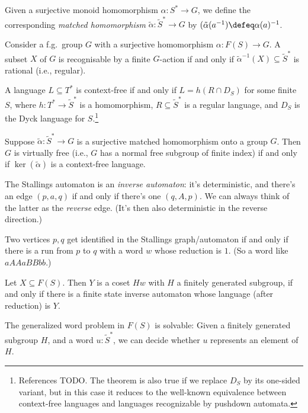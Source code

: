 Given a surjective monoid homomorphism $\alpha : S^* \to G$,
we define the corresponding \emph{matched homomorphism} $\tilde\alpha : \tilde S^* \to G$ by $(\tilde\alpha(a^{-1}) \defeq \alpha(a)^{-1}$.
\begin{theorem}[?]
  Consider a f.g.\ group $G$ with a surjective homomorphism
  $\alpha : F(S) \to G$. A subset $X$ of $G$ is recognisable by a finite $G$-action
  if and only if $\tilde\alpha^{-1}(X) \subseteq \tilde S^*$ is rational (i.e., regular).
\end{theorem}
\begin{theorem}
  A language $L \subseteq T^*$ is context-free if and only if
  $L = h(R \cap D_S)$ for some finite $S$,
  where $h : T^* \to \tilde S^*$ is a homomorphism,
  $R \subseteq \tilde S^*$ is a regular language, and
  $D_S$ is the Dyck language for $S$.\footnote{%
    References TODO. The theorem is also true if we replace $D_S$
    by its one-sided variant, but in this case it reduces to
    the well-known equivalence between context-free languages
    and languages recognizable by pushdown automata.}
\end{theorem}
\begin{theorem}
  Suppose $\tilde\alpha : \tilde S^* \to G$ is a surjective matched homomorphism
  onto a group $G$. Then $G$ is virtually free (i.e., $G$ has a normal free subgroup of finite index) if and only if $\ker(\tilde\alpha)$ is a context-free language.
\end{theorem}
\begin{theorem}

\end{theorem}
The Stallings automaton is an \emph{inverse automaton}:
it's deterministic,
and there's an edge $(p,a,q)$ if and only if there's one $(q,A,p)$.
We can always think of the latter as the \emph{reverse} edge.
(It's then also deterministic in the reverse direction.)

Two vertices $p,q$ get identified in the Stallings graph/automaton
if and only if there is a run from $p$ to $q$ with a word $w$
whose reduction is $1$. (So a word like $aAAaBBbb$.)

\begin{theorem}
  Let $X \subseteq F(S)$. Then $Y$ is a coset $Hw$ with $H$
  a finitely generated subgroup,
  if and only if
  there is a finite state inverse automaton whose language (after reduction)
  is $Y$.
\end{theorem}

\begin{corollary}
  The generalized word problem in $F(S)$ is solvable:
  Given a finitely generated subgroup $H$, and a word $u : \tilde S^*$,
  we can decide whether $u$ represents an element of $H$.
\end{corollary}

